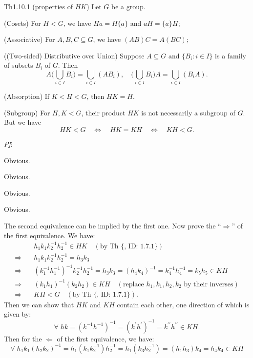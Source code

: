 \documentclass{article}
\begin{document}
\begin{Th}{Th1.10.1 (properties of $HK$)}
    Let $G$ be a group.
    \begin{compactenum}
        \item (Cosets) For $H<G$, we have $Ha = H\{a\}$ and $aH = \{a\}H$;
        \item (Associative) For $A, B, C\subseteq G$, we have $(AB)C = A(BC)$;
        \item ((Two-sided) Distributive over Union) Suppose $A\subseteq G$ and $\{B_i: i\in I\}$ is a family of subsets $B_i$ of $G$. Then
        $$ A\Big(\bigcup_{i\in I} B_i\Big) = \bigcup_{i\in I} (AB_i), \quad \Big(\bigcup_{i\in I} B_i\Big)A = \bigcup_{i\in I} (B_iA). $$
        \item (Absorption) If $K<H<G$, then $HK = H$.
        \item (Subgroup) For $H, K<G$, their product $HK$ is not necessarily a subgroup of $G$. But we have
        $$ HK < G \quad \Longleftrightarrow \quad HK = KH \quad \Longleftrightarrow \quad KH < G. $$
    \end{compactenum}
    \tcblower
    \textit{Pf}:
    \begin{compactenum}
        \item Obvious.
        \item Obvious.
        \item Obvious.
        \item Obvious.
        \item The second equivalence can be implied by the first one. Now prove the ``$\Rightarrow$'' of the first equivalence. We have:
        $$ \begin{aligned}
            & h_1k_1 k_2^{-1}h_2^{-1} \in HK \quad (\text{by Th \{, ID: 1.7.1\}}) \\
            \Longrightarrow \quad & h_1k_1 k_2^{-1}h_2^{-1} = h_3k_3 \\
            \Longrightarrow \quad & (k_1^{-1}h_1^{-1})^{-1}k_2^{-1}h_2^{-1} = h_3k_3 = (h_4k_4)^{-1} = k_4^{-1}h_4^{-1} = k_5h_5 \in KH \\
            \Longrightarrow \quad & (k_1h_1)^{-1}(k_2h_2) \in KH \quad (\text{replace } h_1, k_1, h_2, k_2 \text{ by their inverses}) \\
            \Longrightarrow \quad & KH < G \quad (\text{by Th \{, ID: 1.7.1\}}).
        \end{aligned} $$
        Then we can show that $HK$ and $KH$ contain each other, one direction of which is given by:
        $$ \forall\; hk = (k^{-1}h^{-1})^{-1} = (k^\prime h^\prime)^{-1} = k^{\prime\prime} h^{\prime\prime} \in KH. $$
        Then for the $\Leftarrow$ of the first equivalence, we have:
        $$ \forall\; h_1k_1(h_2k_2)^{-1} = h_1(k_1k_2^{-1})h_2^{-1} = h_1(k_3h_2^{-1}) = (h_1h_3)k_4 = h_4k_4 \in KH $$
    \end{compactenum}
\end{Th}
\end{document}

